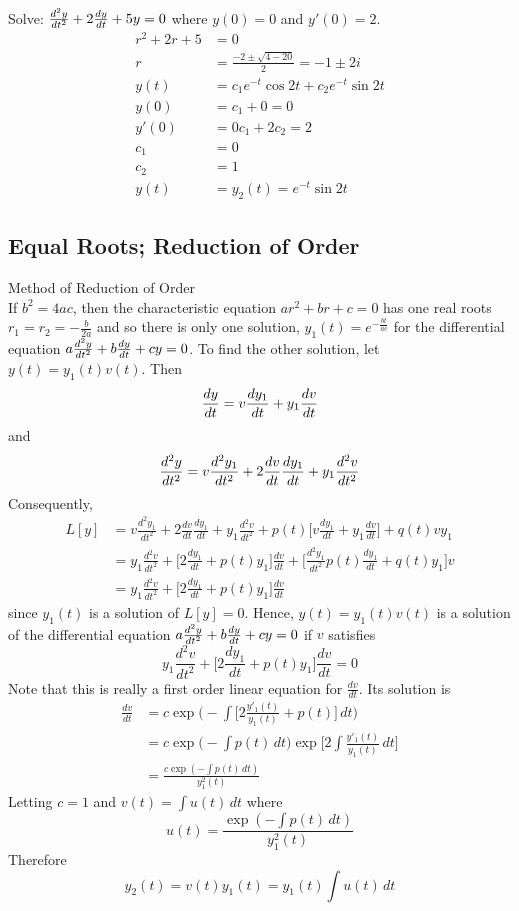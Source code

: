 \documentclass[12pt]{article}
\begin{document}
\begin{example} Solve: $\frac{d^2y}{dt^2} + 2\frac{dy}{dt}+ 5y = 0$ where $y(0) = 0$ and $y'(0) = 2$. $$\begin{aligned} r^2 + 2r + 5 &= 0 \\ r &= \frac{-2 \pm \sqrt{4 - 20}}{2} = -1 \pm 2i \\ y(t) &= c_1e^{-t}\cos 2t + c_2e^{-t}\sin 2t \\ y(0) &= c_1 + 0 = 0 \\ y'(0) &= 0c_1 + 2c_2 = 2 \\ c_1 &= 0 \\ c_2 &= 1 \\ y(t) &= y_2(t) = e^{-t}\sin 2t \end{aligned} $$ \end{example} 

\subsection{Equal Roots; Reduction of Order} 
\begin{definition} Method of Reduction of Order \\ 
If $b^2 = 4ac$, then the characteristic equation $ar^2 + br + c = 0$ has one real roots $r_1 = r_2 = -\frac{b}{2a}$ and so there is only one solution, $y_1(t) = e^{-\frac{bt}{ac}}$ for the differential equation $a\frac{d^2y}{dt^2} + b\frac{dy}{dt} + cy = 0$. To find the other solution, let $y(t) = y_1(t)v(t)$. Then $$\frac{dy}{dt} = v\frac{dy_1}{dt} + y_1\frac{dv}{dt} $$ and $$\frac{d^2y}{dt^2} = v\frac{d^2y_1}{dt^2} + 2\frac{dv}{dt}\frac{dy_1}{dt} + y_1\frac{d^2v}{dt^2}$$ Consequently, $$\begin{aligned} L[y] &= v\frac{d^2y_1}{dt^2} + 2\frac{dv}{dt}\frac{dy_1}{dt} + y_1\frac{d^2v}{dt^2} + p(t)\Big[v\frac{dy_1}{dt} + y_1\frac{dv}{dt}\Big] + q(t)vy_1 \\ &= y_1\frac{d^2v}{dt^2} + \Big[2\frac{dy_1}{dt} + p(t)y_1\Big]\frac{dv}{dt} + \Big[\frac{d^2y_1}{dt^2} p(t)\frac{dy_1}{dt} + q(t)y_1\Big]v \\ 
&= y_1\frac{d^2v}{dt^2} + \Big[2\frac{dy_1}{dt} + p(t)y_1\Big]\frac{dv}{dt} \end{aligned} $$ 
since $y_1(t)$ is a solution of $L[y] = 0$. Hence, $y(t) = y_1(t)v(t)$ is a solution of the differential equation $a\frac{d^2y}{dt^2} + b\frac{dy}{dt} + cy = 0$ if $v$ satisfies $$y_1\frac{d^2v}{dt^2} + \Big[2\frac{dy_1}{dt} + p(t)y_1\Big]\frac{dv}{dt} = 0$$ Note that this is really a first order linear equation for $\frac{dv}{dt}$. Its solution is $$\begin{aligned} \frac{dv}{dt} &= c\exp\Bigg(-\int \Big[ 2\frac{y'_1(t)}{y_1(t)} + p(t)\Big] \, dt\Bigg) \\ &= c\exp\Bigg(-\int p(t) \, dt\Bigg)\exp\Bigg[2\int \frac{y'_1(t)}{y_1(t)} \, dt\Bigg] \\ &= \frac{c\exp(-\int p(t) \, dt)}{y^2_1(t)} \end{aligned} $$ 
Letting $c = 1$ and $v(t) = \int u(t) \, dt$ where $$u(t) = \frac{\exp(-\int p(t) \, dt)}{y^2_1(t)} $$ Therefore $$y_2(t) = v(t)y_1(t) = y_1(t)\int u(t) \, dt $$ \end{definition} 
\end{document}

